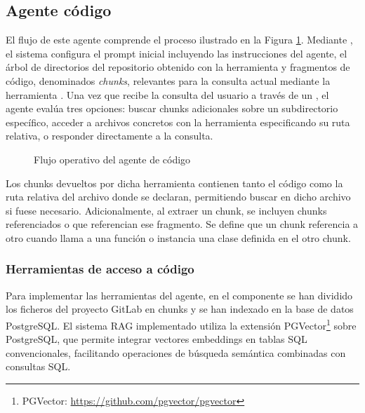 \subsection{Agente código}
El flujo de este agente comprende el proceso ilustrado en la Figura \ref{fig:agente_codigo}. Mediante , el sistema configura el prompt inicial incluyendo las instrucciones del agente, el árbol de directorios del repositorio obtenido con la herramienta  y fragmentos de código, denominados \textit{chunks}, relevantes para la consulta actual mediante la herramienta . Una vez que recibe la consulta del usuario a través de un , el agente evalúa tres opciones: buscar chunks adicionales sobre un subdirectorio específico, acceder a archivos concretos con la herramienta  especificando su ruta relativa, o responder directamente a la consulta.

\begin{figure}[h]
\centering
{}
\caption{Flujo operativo del agente de código}
\label{fig:agente_codigo}
\end{figure}

Los chunks devueltos por dicha herramienta contienen tanto el código como la ruta relativa del archivo donde se declaran, permitiendo buscar en dicho archivo si fuese necesario. Adicionalmente, al extraer un chunk, se incluyen chunks referenciados o que referencian ese fragmento. Se define que un chunk referencia a otro cuando llama a una función o instancia una clase definida en el otro chunk. 

\subsubsection{Herramientas de acceso a código}
\label{sec:herramientas_codigo}
Para implementar las herramientas del agente, en el componente  se han dividido los ficheros del proyecto GitLab en chunks y se han indexado en la base de datos PostgreSQL. El sistema RAG implementado utiliza la extensión PGVector\footnote{PGVector: \url{https://github.com/pgvector/pgvector}} sobre PostgreSQL, que permite integrar vectores embeddings en tablas SQL convencionales, facilitando operaciones de búsqueda semántica combinadas con consultas SQL. 

